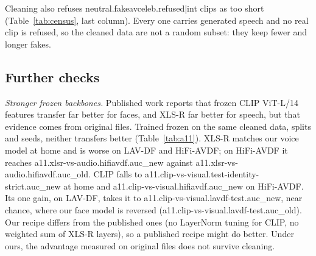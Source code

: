 \documentclass[conference]{IEEEtran}
\begin{document}
Cleaning also refuses {{neutral.fakeavceleb.refused|int}} clips as too short
(Table~\ref{tab:census}, last column). Every one carries generated speech and
no real clip is refused, so the cleaned data are not a random subset: they
keep fewer and longer fakes.

\subsection{Further checks}
\label{sec:further}

\begin{table}[htbp]
\caption{Exploratory: stronger frozen backbones minus our models, ROC-AUC on
each model's own label, mean of three seeds with a 95\% interval}
\label{tab:a11}
\centering
\small
{}
\end{table}

\textit{Stronger frozen backbones.} Published work reports that frozen CLIP
ViT-L/14 features transfer far better for faces, and XLS-R far better for
speech, but that evidence comes from original files. Trained frozen on the same
cleaned data, splits and seeds, neither transfers better
(Table~\ref{tab:a11}). XLS-R matches our voice model at home and is worse on
LAV-DF and HiFi-AVDF; on HiFi-AVDF it reaches
{{a11.xlsr-vs-audio.hifiavdf.auc_new}} against
{{a11.xlsr-vs-audio.hifiavdf.auc_old}}. CLIP falls to
{{a11.clip-vs-visual.test-identity-strict.auc_new}} at home and
{{a11.clip-vs-visual.hifiavdf.auc_new}} on HiFi-AVDF. Its one gain, on LAV-DF,
takes it to {{a11.clip-vs-visual.lavdf-test.auc_new}}, near chance, where our
face model is reversed ({{a11.clip-vs-visual.lavdf-test.auc_old}}). Our recipe
differs from the published ones (no LayerNorm tuning for CLIP, no weighted sum
of XLS-R layers), so a published recipe might do better. Under ours, the
advantage measured on original files does not survive cleaning.
\end{document}
